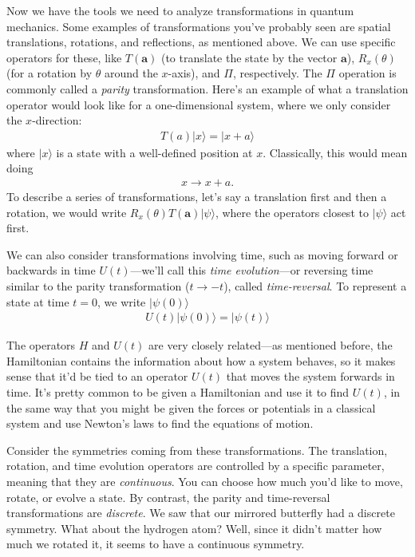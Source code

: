 Now we have the tools we need to analyze transformations in quantum mechanics. Some examples of transformations you've probably seen are spatial translations, rotations, and reflections, as mentioned above. We can use specific operators for these, like $T(\mathbf{a})$ (to translate the state by the vector $\mathbf{a}$), $R_x(\theta)$ (for a rotation by $\theta$ around the $x$-axis), and $\Pi$, respectively. The $\Pi$ operation is commonly called a \emph{parity} transformation. Here's an example of what a translation operator would look like for a one-dimensional system, where we only consider the $x$-direction:
\begin{align*}
    T(a)|x\rangle = |x+a\rangle
\end{align*}
where $|x\rangle$ is a state with a well-defined position at $x$. Classically, this would mean doing
\begin{align*}
    x \rightarrow x+a.
\end{align*}
To describe a series of transformations, let's say a translation first and then a rotation, we would write $R_x(\theta)T(\mathbf{a})|\psi\rangle$, where the operators closest to $|\psi\rangle$ act first.

We can also consider transformations involving time, such as moving forward or backwards in time $U(t)$---we'll call this \emph{time evolution}---or reversing time similar to the parity transformation ($t \rightarrow -t$), called \emph{time-reversal}. To represent a state at time $t=0$, we write $|\psi(0)\rangle$
\begin{align*}
    U(t)|\psi(0)\rangle = |\psi(t)\rangle
\end{align*}

The operators $H$ and $U(t)$ are very closely related---as mentioned before, the Hamiltonian contains the information about how a system behaves, so it makes sense that it'd be tied to an operator $U(t)$ that moves the system forwards in time. It's pretty common to be given a Hamiltonian and use it to find $U(t)$, in the same way that you might be given the forces or potentials in a classical system and use Newton's laws to find the equations of motion.

Consider the symmetries coming from these transformations. The translation, rotation, and time evolution operators are controlled by a specific parameter, meaning that they are \emph{continuous}. You can choose how much you'd like to move, rotate, or evolve a state. By contrast, the parity and time-reversal transformations are \emph{discrete}. We saw that our mirrored butterfly had a discrete symmetry. What about the hydrogen atom? Well, since it didn't matter how much we rotated it, it seems to have a continuous symmetry.

